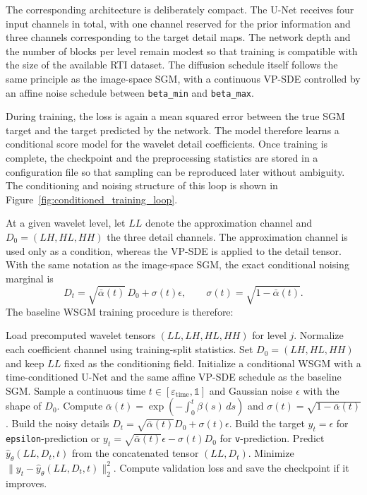 The corresponding architecture is deliberately compact. The U-Net receives
four input channels in total, with one channel reserved for the prior
information and three channels corresponding to the target detail maps. The
network depth and the number of blocks per level remain modest so that training
is compatible with the size of the available RTI dataset. The diffusion
schedule itself follows the same principle as the image-space SGM, with a
continuous VP-SDE controlled by an affine noise schedule between
\texttt{beta\_min} and \texttt{beta\_max}.

During training, the loss is again a mean squared error between the true SGM
target and the target predicted by the network. The model therefore learns a
conditional score model for the wavelet detail coefficients. Once training is
complete, the checkpoint and the preprocessing statistics are stored in a
configuration file so that sampling can be reproduced later without ambiguity.
The conditioning and noising structure of this loop is shown in
Figure~\ref{fig:conditioned_training_loop}.

At a given wavelet level, let $LL$ denote the approximation channel and
$D_0=(LH,HL,HH)$ the three detail channels. The approximation channel is
used only as a condition, whereas the VP-SDE is applied to the detail tensor.
With the same notation as the image-space SGM, the exact conditional noising
marginal is
\[
    D_t
    =
    \sqrt{\bar{\alpha}(t)}\,D_0
    +
    \sigma(t)\epsilon,
    \qquad
    \sigma(t)=\sqrt{1-\bar{\alpha}(t)}.
\]
The baseline WSGM training procedure is therefore:
\begin{algorithm}[H]
\caption{Conditional WSGM training procedure at wavelet level $j$}
\begin{algorithmic}
\STATE Load precomputed wavelet tensors $(LL,LH,HL,HH)$ for level $j$.
\STATE Normalize each coefficient channel using training-split statistics.
\STATE Set $D_0=(LH,HL,HH)$ and keep $LL$ fixed as the conditioning field.
\STATE Initialize a conditional WSGM with a time-conditioned U-Net and the same affine VP-SDE schedule as the baseline SGM.
        \STATE Sample a continuous time $t\in[\varepsilon_{\mathrm{time}},\mathds{1}]$ and Gaussian noise $\epsilon$ with the shape of $D_0$.
        \STATE Compute $\bar{\alpha}(t)=\exp(-\int_0^t\beta(s)\,ds)$ and $\sigma(t)=\sqrt{1-\bar{\alpha}(t)}$.
        \STATE Build the noisy details $D_t=\sqrt{\bar{\alpha}(t)}D_0+\sigma(t)\epsilon$.
        \STATE Build the target $y_t=\epsilon$ for \texttt{epsilon}-prediction or $y_t=\sqrt{\bar{\alpha}(t)}\epsilon-\sigma(t)D_0$ for \texttt{v}-prediction.
        \STATE Predict $\hat{y}_\theta(LL,D_t,t)$ from the concatenated tensor $(LL,D_t)$.
        \STATE Minimize $\|y_t-\hat{y}_\theta(LL,D_t,t)\|_2^2$.
    \ENDFOR
    \STATE Compute validation loss and save the checkpoint if it improves.
\ENDFOR
\end{algorithmic}
\end{algorithm}

